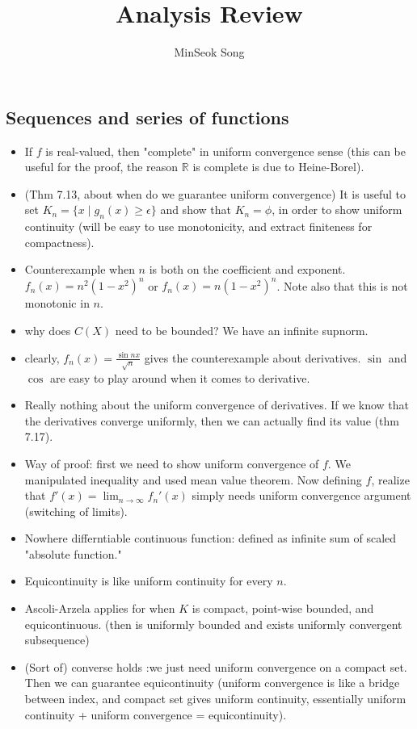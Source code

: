 \documentclass{article}
\title{Analysis Review}
\author{MinSeok Song}
\date{}
\theoremstyle{remark}
\begin{document}
\maketitle 

\subsection*{Sequences and series of functions}
\begin{itemize}
\item If $f$ is real-valued, then "complete" in uniform convergence sense (this can be useful for the proof, the reason $\mathbb{R}$ is complete is due to Heine-Borel).
\item (Thm 7.13, about when do we guarantee uniform convergence) It is useful to set $K_n=\{x\mid g_n (x)\geq \epsilon\}$ and show that $K_n=\phi$, in order to show uniform continuity (will be easy to use monotonicity, and extract finiteness for compactness).
\item Counterexample when $n$ is both on the coefficient and exponent. $f_n (x)=n^2 (1-x^2)^n$ or $f_n (x)=n(1-x^2)^n$. Note also that this is not monotonic in $n$.
\item why does $C(X)$ need to be bounded? We have an infinite supnorm.
\item clearly, $f_n(x)=\frac{\sin nx}{\sqrt n}$ gives the counterexample about derivatives. $\sin$ and $\cos$ are easy to play around when it comes to derivative.
\item Really nothing about the uniform convergence of derivatives. If we know that the derivatives converge uniformly, then we can actually find its value (thm 7.17). 
\item Way of proof: first we need to show uniform convergence of $f$. We manipulated inequality and used mean value theorem. Now defining $f$, realize that $f'(x)=\lim_{n\to\infty}f_n'(x)$ simply needs uniform convergence argument (switching of limits).
\item Nowhere differntiable continuous function: defined as infinite sum of scaled "absolute function." 
\item Equicontinuity is like uniform continuity for every $n$.
\item Ascoli-Arzela applies for when $K$ is compact, point-wise bounded, and equicontinuous. (then is uniformly bounded and exists uniformly convergent subsequence)
\item (Sort of) converse holds :we just need uniform convergence on a compact set. Then we can guarantee equicontinuity (uniform convergence is like a bridge between index, and compact set gives uniform continuity, essentially uniform continuity + uniform convergence = equicontinuity).

\end{itemize}
\end{document}
